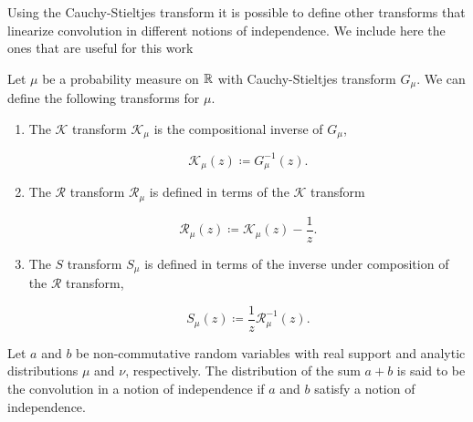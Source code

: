     Using the Cauchy-Stieltjes transform it is possible to define other transforms that linearize convolution in different notions of independence. We include here the ones that are useful for this work

    \begin{definition}
        Let $\mu$ be a probability measure on $\mathbb R$ with Cauchy-Stieltjes transform $G_\mu$. We can define the following transforms for $\mu$.

        \begin{enumerate}
            \item The $\mathcal K$ transform $\mathcal K_\mu$ is the compositional inverse of $G_\mu$,
            
                \[ \mathcal K_\mu (z) \coloneqq G_\mu^{-1}(z). \]

            
            
            \item The $\mathcal R$ transform $\mathcal R_\mu$ is defined in terms of the $\mathcal K$ transform

                \[ \mathcal R_\mu(z) \coloneqq \mathcal K_\mu(z) - \frac1z. \]

            

            \item The $S$ transform $S_\mu$ is defined in terms of the inverse under composition of the $\mathcal R$ transform,
            
            \[ S_\mu(z) \coloneqq \frac1z\mathcal R_{\mu}^{-1}(z).\] 
        \end{enumerate}
    \end{definition}

    Let $a$ and $b$ be non-commutative random variables with real support and analytic distributions $\mu$ and $\nu$, respectively. The distribution of the sum $a+b$ is said to be the convolution in a notion of independence if $a$ and $b$ satisfy a notion of independence.

